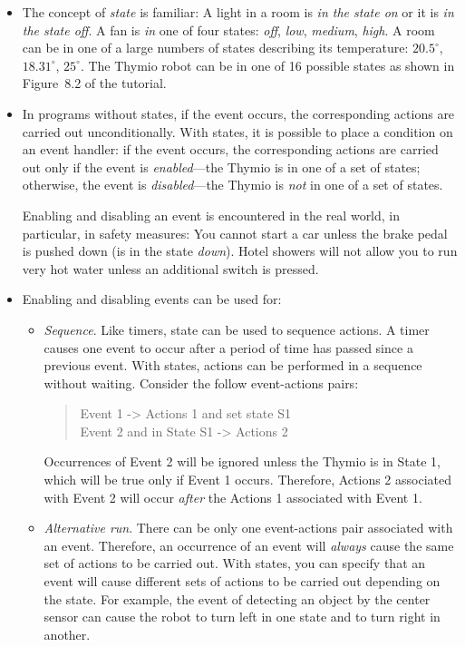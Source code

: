 \documentclass[11pt,a4paper,english]{article}
\begin{document}
\begin{itemize}

\item The concept of \emph{state} is familiar: A light in a room is
\textit{in the state on} or it is \textit{in the state off}. A fan is
\textit{in} one of four states: \textit{off}, \textit{low},
\textit{medium}, \textit{high}. A room can be in one of a large numbers
of states describing its temperature: $20.5^\circ$, $18.31^\circ$,
$25^\circ$. The Thymio robot can be in one of 16 possible states as
shown in Figure~8.2 of the tutorial.

\item In programs without states, if the event occurs, the corresponding
actions are carried out unconditionally. With states, it is possible to
place a condition on an event handler: if the event occurs, the
corresponding actions are carried out only if the event is
\emph{enabled}---the Thymio is in one of a set of states; otherwise, the
event is \emph{disabled}---the Thymio is \emph{not} in one of a set of
states.

Enabling and disabling an event is encountered in the real world, in
particular, in safety measures: You cannot start a car unless the brake
pedal is pushed down (is in the state \textit{down}). Hotel showers
will not allow you to run very hot water unless an additional switch is
pressed.

\item Enabling and disabling events can be used for:

\begin{itemize}

\item \emph{Sequence}. Like timers, state can be used to sequence
actions. A timer causes one event to occur after a period of time has
passed since a previous event. With states, actions can be performed in
a sequence without waiting. Consider the follow event-actions pairs:

\begin{quote}
Event 1 -> Actions 1 and set state S1\\
Event 2 and in State S1 -> Actions 2
\end{quote}

Occurrences of Event 2 will be ignored unless the Thymio is in State 1,
which will be true only if Event 1 occurs. Therefore, Actions 2
associated with Event 2 will occur \emph{after} the Actions 1 associated
with Event 1.

\item \emph{Alternative run}. There can be only one event-actions pair
associated with an event. Therefore, an occurrence of an event will
\emph{always} cause the same set of actions to be carried out. With
states, you can specify that an event will cause different sets of
actions to be carried out depending on the state. For example, the event
of detecting an object by the center sensor can cause the robot to turn
left in one state and to turn right in another.


\end{itemize}
\end{itemize}
\end{document}
